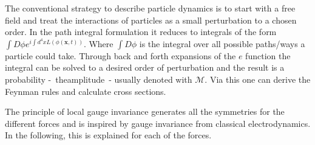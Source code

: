 The conventional strategy to describe particle dynamics is to start with a free field and treat the interactions of particles as a small perturbation to a chosen order. In the path integral formulation it reduces to integrals of the form \mbox{$\int D\phi e^{i\int d^4x L(\phi(\bm{x},t))}$}. Where $\int D\phi$ is the integral over all possible paths/ways a particle could take. Through back and forth expansions of the $e$ function the integral can be solved to a desired order of perturbation and the result is a probability \mbox{- theamplitude -} usually denoted with $\mathcal{M}$. Via this one can derive the Feynman rules and calculate cross sections.

The principle of local gauge invariance generates all the symmetries for the different forces and is inspired by gauge invariance from classical electrodynamics. In the following, this is explained for each of the forces.

